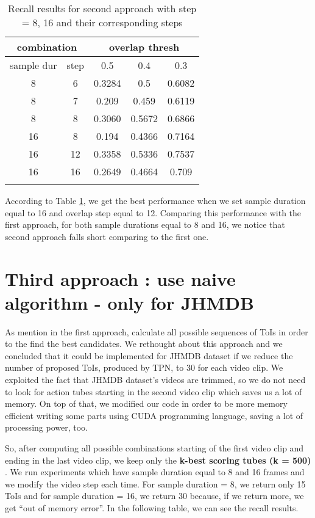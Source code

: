\begin{center}
\begin{longtable}{||c c||c c c||}
  \hline
  \multicolumn{2}{||c||}{\textbf{combination}} &\multicolumn{3}{|c||}{\textbf{overlap thresh}}\\

  \hline
  sample dur & step &   0.5  &  0.4 &  0.3 \\
  \hline   \hline
  8 & 6 & 0.3284 & 0.5 & 0.6082  \\
  \hline
  8 & 7 & 0.209	& 0.459 & 0.6119 \\
  \hline
  8 & 8 & 0.3060 & 0.5672 & 0.6866 \\
  \hline
  16 & 8  & 0.194 & 0.4366 & 0.7164 \\
  \hline
  16 & 12 & 0.3358 & 0.5336 & 0.7537 \\
  \hline
  16 & 16 & 0.2649 & 0.4664 & 0.709 \\
  
  \hline 

  \caption{Recall results for second approach with step = 8, 16 and their corresponding steps }
  \label{table:conn_app2}
\end{longtable} 
\end{center}

According to  Table \ref{table:conn_app2}, we get the best performance when we set sample duration equal to  16 and overlap step equal to 12.
Comparing this performance with the first approach, for both sample durations equal to 8 and 16, we notice that second approach falls short
comparing to the first one. 

\section{Third approach : use naive algorithm - only for JHMDB}

As mention in the first approach, \cite{DBLP:journals/corr/HouCS17} calculate all possible sequences of ToIs in order to the find the best
candidates. We rethought about this approach and we concluded that it could be implemented for JHMDB dataset if we reduce the number of proposed
ToIs, produced by TPN,  to 30 for each video clip. We exploited the fact that JHMDB dataset's videos are trimmed, so we do not need to look
for action tubes starting in the second video clip which saves us a lot of memory. On top of that, we modified our code
in order to be more memory efficient  writing some parts using CUDA programming language, saving a lot of processing power, too. \par
So, after computing all possible combinations starting of the first video clip and ending in the last video clip, we keep only the
\textbf{k-best scoring tubes (k = 500) }. We run experiments which have sample duration equal to 8 and 16 frames and we modify the video step each time.
For sample duration = 8, we return only 15 ToIs and for sample duration = 16, we return 30 because, if we return more, we get ``out of memory error''.
In the following table, we can see the recall results. \par  

